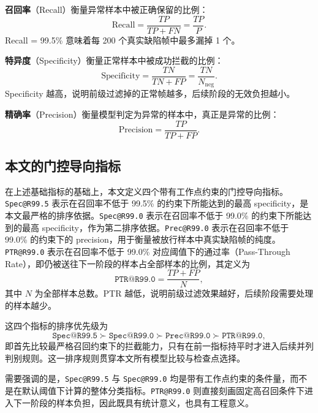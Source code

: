 \documentclass[UTF8,openany,12pt]{ctexbook}
\newcommand{\formalmetric}[1]{\texttt{#1}}
\begin{document}
\noindent\textbf{召回率}（Recall）衡量异常样本中被正确保留的比例：
\begin{equation}
\mathrm{Recall} = \frac{TP}{TP + FN} = \frac{TP}{P}.
\end{equation}
Recall = 99.5\% 意味着每 200 个真实缺陷帧中最多漏掉 1 个。

\noindent\textbf{特异度}（Specificity）衡量正常样本中被成功拦截的比例：
\begin{equation}
\mathrm{Specificity} = \frac{TN}{TN + FP} = \frac{TN}{N_{\mathrm{neg}}}.
\end{equation}
Specificity 越高，说明前级过滤掉的正常帧越多，后续阶段的无效负担越小。

\noindent\textbf{精确率}（Precision）衡量模型判定为异常的样本中，真正是异常的比例：
\begin{equation}
\mathrm{Precision} = \frac{TP}{TP + FP}.
\end{equation}

\subsection{本文的门控导向指标}
在上述基础指标的基础上，本文定义四个带有工作点约束的门控导向指标。\formalmetric{Spec@R99.5} 表示在召回率不低于 99.5\% 的约束下所能达到的最高 specificity，是本文最严格的排序依据。\formalmetric{Spec@R99.0} 表示在召回率不低于 99.0\% 的约束下所能达到的最高 specificity，作为第二排序依据。\formalmetric{Prec@R99.0} 表示在召回率不低于 99.0\% 的约束下的 precision，用于衡量被放行样本中真实缺陷帧的纯度。\formalmetric{PTR@R99.0} 表示在召回率不低于 99.0\% 对应阈值下的通过率（Pass-Through Rate），即仍被送往下一阶段的样本占全部样本的比例，其定义为
\begin{equation}
\formalmetric{PTR@R99.0} = \frac{TP + FP}{N},
\end{equation}
其中 $N$ 为全部样本总数。PTR 越低，说明前级过滤效果越好，后续阶段需要处理的样本越少。

这四个指标的排序优先级为
\begin{equation}
\formalmetric{Spec@R99.5} \succ \formalmetric{Spec@R99.0} \succ \formalmetric{Prec@R99.0} \succ \formalmetric{PTR@R99.0},
\end{equation}
即首先比较最严格召回约束下的拦截能力，只有在前一指标持平时才进入后续并列判别规则。这一排序规则贯穿本文所有模型比较与检查点选择。

需要强调的是，\formalmetric{Spec@R99.5} 与 \formalmetric{Spec@R99.0} 均是带有工作点约束的条件量，而不是在默认阈值下计算的整体分类指标。\formalmetric{PTR@R99.0} 则直接刻画固定高召回条件下进入下一阶段的样本负担，因此既具有统计意义，也具有工程意义。
\end{document}

